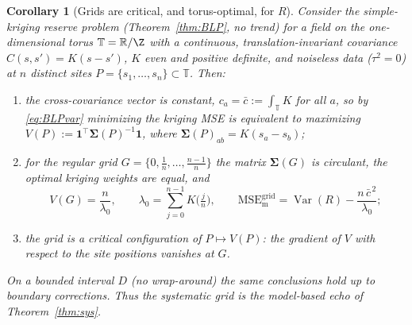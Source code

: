 \documentclass{amsart}
\newtheorem{corollary}[theorem]{Corollary}
\theoremstyle{definition}
\newcommand{\R}{\mathbb{R}}
\newcommand{\Var}{\operatorname{Var}}
\begin{document}
\begin{corollary}[Grids are critical, and torus-optimal, for $R$]
\label{cor:grids}
Consider the simple-kriging reserve problem (Theorem~\ref{thm:BLP}, no
trend) for a field on the one-dimensional torus $\mathbb T=\R/\Z$ with a
continuous, translation-invariant covariance $C(s,s')=K(s-s')$, $K$ even
and positive definite, and noiseless data ($\tau^2=0$) at $n$ distinct
sites $P=\{s_1,\dots,s_n\}\subset\mathbb T$. Then:
\begin{enumerate}
\item[\textup{(i)}] the cross-covariance vector is \emph{constant},
$c_a=\bar c:=\int_{\mathbb T}K$ for all $a$, so by \eqref{eq:BLPvar}
minimizing the kriging MSE is equivalent to \emph{maximizing}
$V(P):=\mathbf 1^\top\boldsymbol\Sigma(P)^{-1}\mathbf 1$, where
$\boldsymbol\Sigma(P)_{ab}=K(s_a-s_b)$;
\item[\textup{(ii)}] for the regular grid $G=\{0,\tfrac1n,\dots,\tfrac{n-1}n\}$
the matrix $\boldsymbol\Sigma(G)$ is circulant, the optimal kriging weights
are equal, and
\[
V(G)=\frac{n}{\lambda_0},\qquad \lambda_0=\sum_{j=0}^{n-1}K\!\big(\tfrac jn\big),
\qquad
\mathrm{MSE}_{\mathrm m}^{\mathrm{grid}}=\Var(R)-\frac{n\,\bar c^{\,2}}{\lambda_0};
\]
\item[\textup{(iii)}] the grid is a \emph{critical configuration} of
$P\mapsto V(P)$: the gradient of $V$ with respect to the site positions
vanishes at $G$.
\end{enumerate}
On a bounded interval $D$ (no wrap-around) the same conclusions hold up to
boundary corrections. Thus the systematic grid is the model-based echo of
Theorem~\ref{thm:sys}.
\end{corollary}
\end{document}
